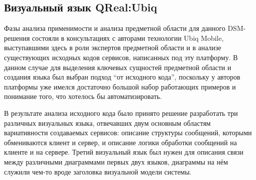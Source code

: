 \subsection{Визуальный язык QReal:Ubiq}
Фазы анализа применимости и анализа предметной области для данного \ac{DSM}-решения состояли 
в консультациях с авторами технологии Ubiq Mobile, выступавшими здесь в роли экспертов 
предметной области и в анализе существующих исходных кодов сервисов, написанных под 
эту платформу. В данном случае для выделения ключевых сущностей предметной области и 
создания языка был выбран подход "`от исходного кода"', поскольку у авторов платформы 
уже имелся достаточно большой набор работающих примеров и понимание того, что хотелось 
бы автоматизировать.

В результате анализа исходного кода было принято решение разработать три различных 
визуальных языка, отвечавших двум основным областям вариативности создаваемых сервисов: 
описание структуры сообщений, которыми обмениваются клиент и сервер, и описание логики 
обработки сообщений на клиенте и на сервере. Третий визуальный язык был нужен для 
описания связи между различными диаграммами первых двух языков, диаграммы на нём 
служили чем-то вроде заголовка визуальной модели системы. 

